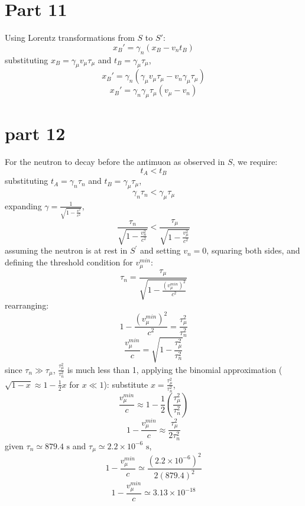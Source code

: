 \documentclass{article}
\begin{document}
\section{Part 11}
Using Lorentz transformations from $S$ to $S'$:
$$x_B' = \gamma_n (x_B - v_n t_B)$$
substituting $x_B = \gamma_\mu v_\mu \tau_\mu$ and $t_B = \gamma_\mu \tau_\mu$,
$$x_B' = \gamma_n (\gamma_\mu v_\mu \tau_\mu - v_n \gamma_\mu \tau_\mu)$$
$$x_B' = \gamma_n \gamma_\mu \tau_\mu (v_\mu - v_n)$$

\section{part 12}
For the neutron to decay before the antimuon as observed in $S$, we require:
$$t_A < t_B$$  
substituting $t_A = \gamma_n \tau_n$ and $t_B = \gamma_\mu \tau_\mu$,
$$\gamma_n \tau_n < \gamma_\mu \tau_\mu$$  
expanding $\gamma = \frac{1}{\sqrt{1 - \frac{v^2}{c^2}}}$,
$$\frac{\tau_n}{\sqrt{1 - \frac{v_n^2}{c^2}}} < \frac{\tau_\mu}{\sqrt{1 - \frac{v_\mu^2}{c^2}}}$$  
assuming the neutron is at rest in $S^{\prime}$ and setting $v_n = 0$, squaring both sides, and defining the threshold condition for $v_\mu^{min}$:
$$\tau_n = \frac{\tau_\mu}{\sqrt{1 - \frac{(v_\mu^{min})^2}{c^2}}}$$
rearranging:
$$1 - \frac{(v_\mu^{min})^2}{c^2} = \frac{\tau_\mu^2}{\tau_n^2}$$  
$$\frac{v_\mu^{min}}{c} = \sqrt{1 - \frac{\tau_\mu^2}{\tau_n^2}}$$
since $\tau_n \gg \tau_\mu$, $\frac{\tau_\mu^2}{\tau_n^2}$ is much less than 1, applying the binomial approximation ($\sqrt{1 - x} \approx 1 - \frac{1}{2}x$ for $x \ll 1$):
substitute $x = \frac{\tau_\mu^2}{\tau_n^2}$,
$$\frac{v_\mu^{min}}{c} \approx 1 - \frac{1}{2}\left(\frac{\tau_\mu^2}{\tau_n^2}\right)$$
$$1 - \frac{v_\mu^{min}}{c} \approx \frac{\tau_\mu^2}{2\tau_n^2}$$
given $\tau_n \simeq 879.4 \text{ s}$ and $\tau_\mu \simeq 2.2 \times 10^{-6} \text{ s}$,
$$1 - \frac{v_\mu^{min}}{c} \simeq \frac{(2.2 \times 10^{-6})^2}{2(879.4)^2}$$
$$1 - \frac{v_\mu^{min}}{c} \simeq 3.13 \times 10^{-18}$$
\end{document}
